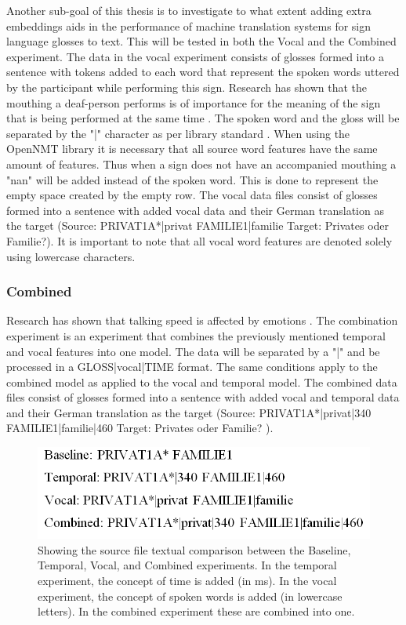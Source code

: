 Another sub-goal of this thesis is to investigate to what extent adding extra embeddings aids in the performance of machine translation systems for sign language glosses to text. This will be tested in both the Vocal and the Combined experiment. The data in the vocal experiment consists of glosses formed into a sentence with tokens added to each word that represent the spoken words uttered by the participant while performing this sign. Research has shown that the mouthing a deaf-person performs is of importance for the meaning of the sign that is being performed at the same time \cite{konradoffentliches}. The spoken word and the gloss will be separated by the "|" character as per library standard \cite{klein-etal-2017-opennmt}. When using the OpenNMT library \cite{klein-etal-2017-opennmt} it is necessary that all source word features have the same amount of features. Thus when a sign does not have an accompanied mouthing a "nan" will be added instead of the spoken word. This is done to represent the empty space created by the empty row. The vocal data files consist of glosses formed into a sentence with added vocal data and their German translation as the target (Source: PRIVAT1A*|privat FAMILIE1|familie Target: Privates oder Familie?). It is important to note that all vocal word features are denoted solely using lowercase characters.

\subsubsection{Combined}

Research has shown that talking speed is affected by emotions \cite{kshirsagar2002multilayer}. The combination experiment is an experiment that combines the previously mentioned temporal and vocal features into one model.  The data will be separated by a "|" and be processed in a GLOSS|vocal|TIME format. The same conditions apply to the combined model as applied to the vocal and temporal model. The combined data files consist of glosses formed into a sentence with added vocal and temporal data and their German translation as the target (Source: PRIVAT1A*|privat|340 FAMILIE1|familie|460 Target: Privates oder Familie? \cite{dgscorpus_3}).

\begin{figure}[h]
\caption{Showing the source file textual comparison between the Baseline, Temporal, Vocal, and Combined experiments. In the temporal experiment, the concept of time is added (in ms). In the vocal experiment, the concept of spoken words is added (in lowercase letters). In the combined experiment these are combined into one.}
 \centering 
 \includegraphics[width=14cm]{Bachelor CSAI thesis template/images/baseline_compared.PNG}
 
 \label{fig:baseline_comparison}
\end{figure}


